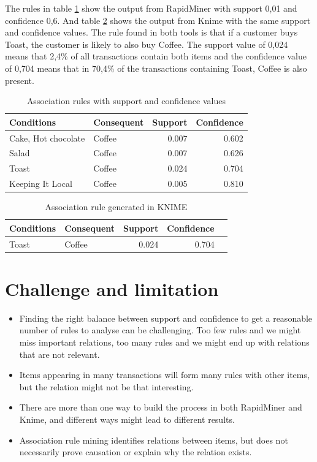 The rules in table \ref{tab:rapidminer_rules} show the output from RapidMiner with
support 0,01 and confidence 0,6. And table \ref{tab:knime_rule} shows the output from Knime with
the same support and confidence values. The rule found in both tools is that if a customer buys
Toast, the customer is likely to also buy Coffee. The support value of 0,024 means that 2,4\%
of all transactions contain both items and the confidence value of 0,704 means that in 70,4\%
of the transactions containing Toast, Coffee is also present.

\begin{table}[H]
\centering
\caption{Association rules with support and confidence values}
\begin{tabular}{l l r r}
\hline
\textbf{Conditions} & \textbf{Consequent} & \textbf{Support} & \textbf{Confidence} \\
\hline
Cake, Hot chocolate & Coffee & 0.007 & 0.602 \\
Salad               & Coffee & 0.007 & 0.626 \\
Toast               & Coffee & 0.024 & 0.704 \\
Keeping It Local    & Coffee & 0.005 & 0.810 \\
\hline
\end{tabular}
\label{tab:rapidminer_rules}
\end{table}

\begin{table}[H]
\centering
\caption{Association rule generated in KNIME}
\begin{tabular}{l l r r r}
\hline
\textbf{Conditions} & \textbf{Consequent} & \textbf{Support} & \textbf{Confidence} \\
\hline
Toast & Coffee & 0.024 & 0.704 \\
\hline
\end{tabular}
\label{tab:knime_rule}
\end{table}

\section{Challenge and limitation}

\begin{itemize}
    \item Finding the right balance between support and confidence to get a reasonable number of rules
    to analyse can be challenging. Too few rules and we might miss important relations, too many rules
    and we might end up with relations that are not relevant.
    
    \item Items appearing in many transactions will form many rules with other items, but the relation
    might not be that interesting.
    
    \item There are more than one way to build the process in both RapidMiner and Knime, and
    different ways might lead to different results.

    \item Association rule mining identifies relations between items, but does not necessarily prove causation
    or explain why the relation exists.
\end{itemize}
